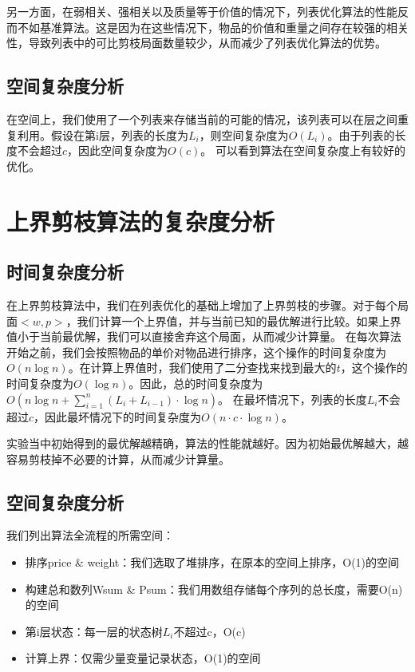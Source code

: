 \documentclass[openany]{book}
\begin{document}
另一方面，在弱相关、强相关以及质量等于价值的情况下，列表优化算法的性能反而不如基准算法。这是因为在这些情况下，物品的价值和重量之间存在较强的相关性，导致列表中的可比剪枝局面数量较少，从而减少了列表优化算法的优势。

\subsection{空间复杂度分析}
在空间上，我们使用了一个列表来存储当前的可能的情况，该列表可以在层之间重复利用。假设在第i层，列表的长度为$L_i$，则空间复杂度为$O(L_i)$。由于列表的长度不会超过$c$，因此空间复杂度为$O(c)$。
可以看到算法在空间复杂度上有较好的优化。

\section{上界剪枝算法的复杂度分析}
\subsection{时间复杂度分析}
在上界剪枝算法中，我们在列表优化的基础上增加了上界剪枝的步骤。对于每个局面$<w,p>$，我们计算一个上界值，并与当前已知的最优解进行比较。如果上界值小于当前最优解，我们可以直接舍弃这个局面，从而减少计算量。
在每次算法开始之前，我们会按照物品的单价对物品进行排序，这个操作的时间复杂度为$O(n \log n)$。在计算上界值时，我们使用了二分查找来找到最大的$t$，这个操作的时间复杂度为$O(\log n)$。因此，总的时间复杂度为$O(n \log n + \sum_{i=1}^{n} (L_i + L_{i-1}) \cdot \log n)$。
在最坏情况下，列表的长度$L_i$不会超过$c$，因此最坏情况下的时间复杂度为$O(n \cdot c \cdot \log n)$。

实验当中初始得到的最优解越精确，算法的性能就越好。因为初始最优解越大，越容易剪枝掉不必要的计算，从而减少计算量。

\subsection{空间复杂度分析}
我们列出算法全流程的所需空间：
\begin{itemize}
    \item 排序price \& weight：我们选取了堆排序，在原本的空间上排序，O(1)的空间
    \item 构建总和数列Wsum \& Psum：我们用数组存储每个序列的总长度，需要O(n)的空间
    \item 第i层状态：每一层的状态树$L_i$不超过c，O(c)
    \item 计算上界：仅需少量变量记录状态，O(1)的空间
\end{itemize}
\end{document}

